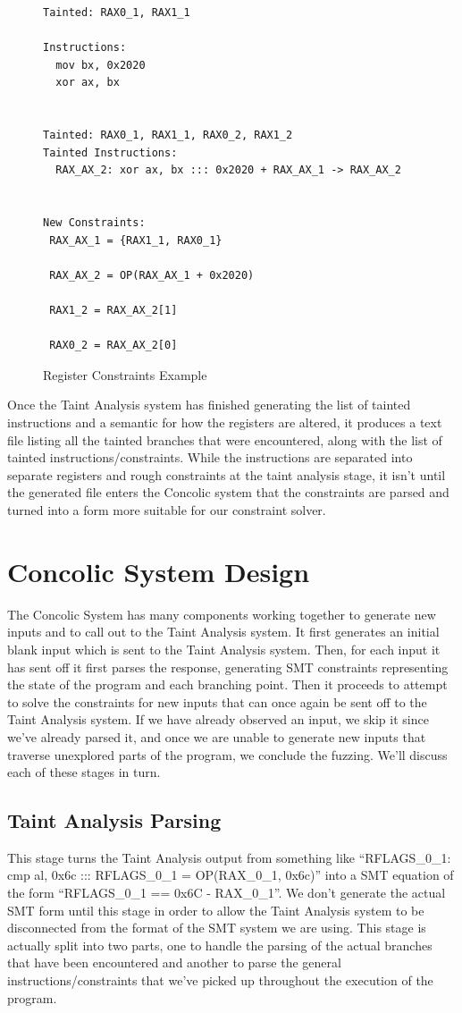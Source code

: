 \begin{figure}[t]
\centering
\begin{verbatim}
Tainted: RAX0_1, RAX1_1

Instructions:
  mov bx, 0x2020
  xor ax, bx


Tainted: RAX0_1, RAX1_1, RAX0_2, RAX1_2
Tainted Instructions:
  RAX_AX_2: xor ax, bx ::: 0x2020 + RAX_AX_1 -> RAX_AX_2


New Constraints:
 RAX_AX_1 = {RAX1_1, RAX0_1}

 RAX_AX_2 = OP(RAX_AX_1 + 0x2020)

 RAX1_2 = RAX_AX_2[1]

 RAX0_2 = RAX_AX_2[0]
\end{verbatim}
\caption{Register Constraints Example}
\label{figure:regexample}
\end{figure}

Once the Taint Analysis system has finished generating the list of tainted
instructions and a semantic for how the registers are altered, it produces a
text file listing all the tainted branches that were encountered, along with the
list of tainted instructions/constraints. While the instructions are separated
into separate registers and rough constraints at the taint analysis stage, it
isn't until the generated file enters the Concolic system that the constraints
are parsed and turned into a form more suitable for our constraint solver.

\section{Concolic System Design}
The Concolic System has many components working together to generate new inputs
and to call out to the Taint Analysis system. It first generates an initial
blank input which is sent to the Taint Analysis system. Then, for each input it
has sent off it first parses the response, generating SMT constraints
representing the state of the program and each branching point. Then it proceeds
to attempt to solve the constraints for new inputs that can once again be sent
off to the Taint Analysis system. If we have already observed an input, we skip
it since we've already parsed it, and once we are unable to generate new inputs
that traverse unexplored parts of the program, we conclude the fuzzing. We'll
discuss each of these stages in turn.

\subsection{Taint Analysis Parsing}
This stage turns the Taint Analysis output from something like 
``RFLAGS\_0\_1: cmp al, 0x6c ::: RFLAGS\_0\_1 = OP(RAX\_0\_1, 0x6c)'' into a SMT
equation of the form ``RFLAGS\_0\_1 == 0x6C - RAX\_0\_1''. We don't generate the
actual SMT form until this stage in order to allow the Taint Analysis system to
be disconnected from the format of the SMT system we are using. This stage is
actually split into two parts, one to handle the parsing of the actual branches
that have been encountered and another to parse the general
instructions/constraints that we've picked up throughout the execution of the
program.

